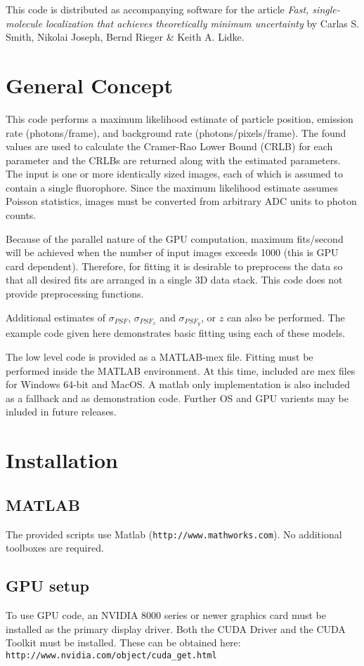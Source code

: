 \documentclass[11pt,letterpaper]{article}
\begin{document}
This code is distributed as accompanying software for the article {\it Fast, single-molecule localization that achieves theoretically minimum uncertainty} by Carlas S. Smith, Nikolai Joseph, Bernd Rieger \& Keith A. Lidke.

\section{General Concept}
This code performs a maximum likelihood estimate of particle position, emission rate (photons/frame), and background rate (photons/pixels/frame). The found values are used to calculate the Cramer-Rao Lower Bound (CRLB) for each parameter and the CRLBs are returned along with the estimated parameters. The input is one or more identically sized images, each of which is assumed to contain a single fluorophore.  Since the maximum likelihood estimate assumes Poisson statistics, images must be converted from arbitrary ADC units to photon counts.

Because of the parallel nature of the GPU computation, maximum fits/second will be achieved when the number of input images exceeds 1000 (this is GPU card dependent).  Therefore, for fitting it is desirable to preprocess the data so that all desired fits are arranged in a single 3D data stack.  This code does not provide preprocessing functions.

Additional estimates of $\sigma_{PSF}$, $\sigma_{PSF_x}$ and $\sigma_{PSF_y}$, or $z$ can also be performed.   The example code given here demonstrates basic fitting using each of these models. 

The low level code is provided as a MATLAB-mex file. Fitting must be performed inside the MATLAB environment. At this time, included are mex files for Windows 64-bit  and MacOS. A matlab only implementation is also included as a fallback and as demonstration code. Further OS and GPU varients may be inluded in future releases.   

\section{Installation}

\subsection{MATLAB}
The provided scripts use Matlab ({\tt http://www.mathworks.com}). No additional toolboxes are required.

\subsection{GPU setup}
To use GPU code, an NVIDIA 8000 series or newer graphics card must be installed as the primary display driver. Both the CUDA Driver and the CUDA Toolkit must be installed.  These can be obtained here:\\
{\tt http://www.nvidia.com/object/cuda\_get.html}
\end{document}
